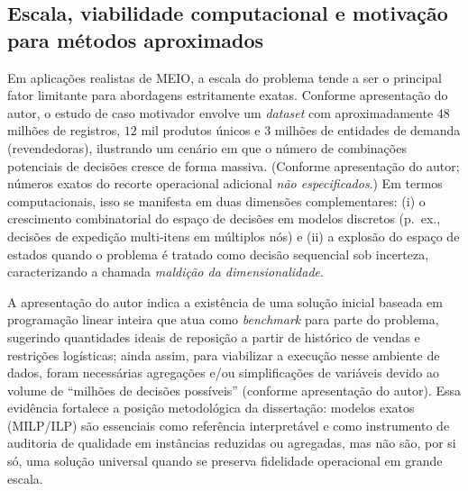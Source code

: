 \subsection{Escala, viabilidade computacional e motivação para métodos aproximados}

Em aplicações realistas de MEIO, a escala do problema tende a ser o principal fator limitante para abordagens estritamente exatas. Conforme apresentação do autor, o estudo de caso motivador envolve um \emph{dataset} com aproximadamente \(48\) milhões de registros, \(12\) mil produtos únicos e \(3\) milhões de entidades de demanda (revendedoras), ilustrando um cenário em que o número de combinações potenciais de decisões cresce de forma massiva. (Conforme apresentação do autor; números exatos do recorte operacional adicional \emph{não especificados}.) Em termos computacionais, isso se manifesta em duas dimensões complementares: (i) o crescimento combinatorial do espaço de decisões em modelos discretos (p.\ ex., decisões de expedição multi-itens em múltiplos nós) e (ii) a explosão do espaço de estados quando o problema é tratado como decisão sequencial sob incerteza, caracterizando a chamada \emph{maldição da dimensionalidade}. \cite{Boute2022DRLInventoryRoadmap,Geevers2024MEIODRL,Ziegner2025IMARL}

A apresentação do autor indica a existência de uma solução inicial baseada em programação linear inteira que atua como \emph{benchmark} para parte do problema, sugerindo quantidades ideais de reposição a partir de histórico de vendas e restrições logísticas; ainda assim, para viabilizar a execução nesse ambiente de dados, foram necessárias agregações e/ou simplificações de variáveis devido ao volume de ``milhões de decisões possíveis'' (conforme apresentação do autor). Essa evidência fortalece a posição metodológica da dissertação: modelos exatos (MILP/ILP) são essenciais como referência interpretável e como instrumento de auditoria de qualidade em instâncias reduzidas ou agregadas, mas não são, por si só, uma solução universal quando se preserva fidelidade operacional em grande escala. \cite{Shapiro2001ModelingSupplyChain,AhujaMagnantiOrlin1993NetworkFlows}

